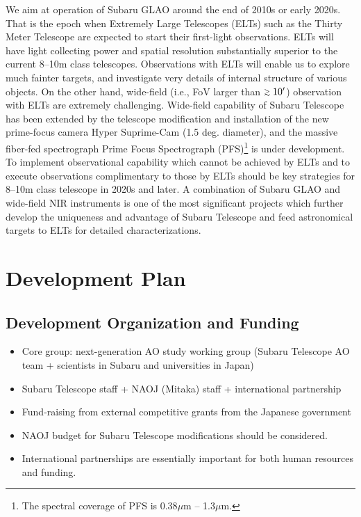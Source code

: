 We aim at operation of Subaru GLAO around the end of 2010s or early
2020s. That is the epoch when Extremely Large Telescopes (ELTs) such as
the Thirty Meter Telescope are expected to start their first-light
observations. ELTs will have light collecting power and spatial
resolution substantially superior to the current 8--10m class
telescopes. Observations with ELTs will enable us to explore much
fainter targets, and investigate very details of internal structure of
various objects. On the other hand, wide-field (i.e., FoV larger than
$\gsim10'$) observation with ELTs are extremely challenging. Wide-field
capability of Subaru Telescope has been extended by the telescope
modification and installation of the new prime-focus camera Hyper
Suprime-Cam (1.5 deg. diameter), and the massive fiber-fed spectrograph 
Prime Focus Spectrograph (PFS)\footnote{The spectral coverage of PFS is
0.38$\mu$m -- 1.3$\mu$m.} is under development.
To implement observational capability which cannot be achieved by ELTs
and to execute observations complimentary to those by ELTs should be key
strategies for 8--10m class telescope in 2020s and later. 
A combination of Subaru GLAO and wide-field NIR instruments is one
of the most significant projects which further develop the uniqueness
and advantage of Subaru Telescope and feed astronomical targets to ELTs
for detailed characterizations.

\bigskip



\section{Development Plan}


\subsection{Development Organization and Funding}

\begin{itemize}
 \setlength{\itemsep}{-3pt}
 \item Core group: next-generation AO study working group (Subaru
       Telescope AO team + scientists in Subaru and universities in
       Japan)
 \item Subaru Telescope staff + NAOJ (Mitaka) staff + international
       partnership
 \item Fund-raising from external competitive grants from the Japanese 
       government 
 \item NAOJ budget for Subaru Telescope modifications should be
       considered. 
 \item International partnerships are essentially important for both
       human resources and funding.
\end{itemize}

